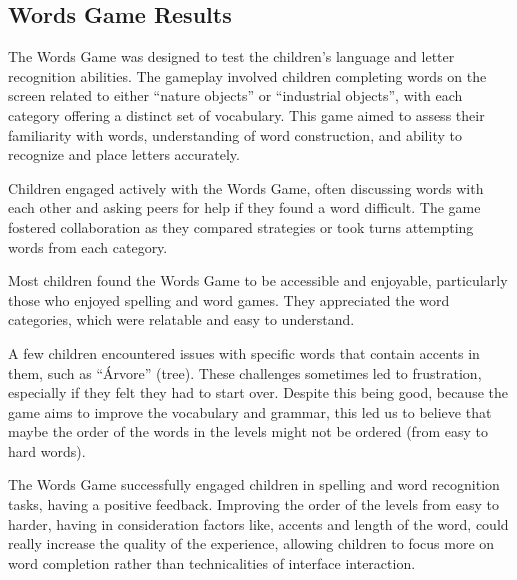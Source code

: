 \subsection{Words Game Results}
The Words Game was designed to test the children's language and letter recognition abilities. The gameplay involved children completing words on the screen related to either ``nature objects'' or ``industrial objects'', with each category offering a distinct set of vocabulary. This game aimed to assess their familiarity with words, understanding of word construction, and ability to recognize and place letters accurately.

Children engaged actively with the Words Game, often discussing words with each other and asking peers for help if they found a word difficult. The game fostered collaboration as they compared strategies or took turns attempting words from each category.

Most children found the Words Game to be accessible and enjoyable, particularly those who enjoyed spelling and word games. They appreciated the word categories, which were relatable and easy to understand.

A few children encountered issues with specific words that contain accents in them, such as ``Árvore'' (tree). These challenges sometimes led to frustration, especially if they felt they had to start over. Despite this being good, because the game aims to improve the vocabulary and grammar, this led us to believe that maybe the order of the words in the levels might not be ordered (from easy to hard words).

The Words Game successfully engaged children in spelling and word recognition tasks, having a positive feedback. Improving the order of the levels from easy to harder, having in consideration factors like, accents and length of the word, could really increase the quality of the experience, allowing children to focus more on word completion rather than technicalities of interface interaction.





